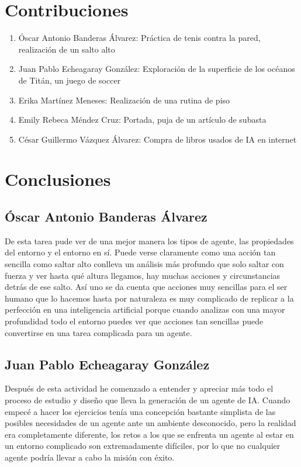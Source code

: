 \documentclass{article}
\begin{document}
    \section{Contribuciones}
        \begin{enumerate}
            \item Óscar Antonio Banderas Álvarez: Práctica de tenis contra la pared, realización de un salto alto
            \item Juan Pablo Echeagaray González: Exploración de la superficie de los océanos de Titán, un juego de soccer
            \item Erika Martínez Meneses: Realización de una rutina de piso
            \item Emily Rebeca Méndez Cruz: Portada, puja de un artículo de subasta
            \item César Guillermo Vázquez Álvarez: Compra de libros usados de IA en internet
        \end{enumerate}

    \section{Conclusiones}
        \subsection{Óscar Antonio Banderas Álvarez}
            De esta tarea pude ver de una mejor manera los tipos de agente, las propiedades del entorno y el entorno en sí. Puede verse claramente como una acción tan sencilla como saltar alto conlleva un análisis más profundo que solo saltar con fuerza y ver hasta qué altura llegamos, hay muchas acciones y circunstancias detrás de ese salto. Así uno se da cuenta que acciones muy sencillas para el ser humano que lo hacemos hasta por naturaleza es muy complicado de replicar a la perfección en una inteligencia artificial porque cuando analizas con una mayor profundidad todo el entorno puedes ver que acciones tan sencillas puede convertirse en una tarea complicada para un agente.

        \subsection{Juan Pablo Echeagaray González}
            Después de esta actividad he comenzado a entender y apreciar más todo el proceso de estudio y diseño que lleva la generación de un agente de IA. Cuando empecé a hacer los ejercicios tenía una concepción bastante simplista de las posibles necesidades de un agente ante un ambiente desconocido, pero la realidad era completamente diferente, los retos a los que se enfrenta un agente al estar en un entorno complicado son extremadamente difíciles, por lo que no cualquier agente podría llevar a cabo la misión con éxito.
\end{document}
